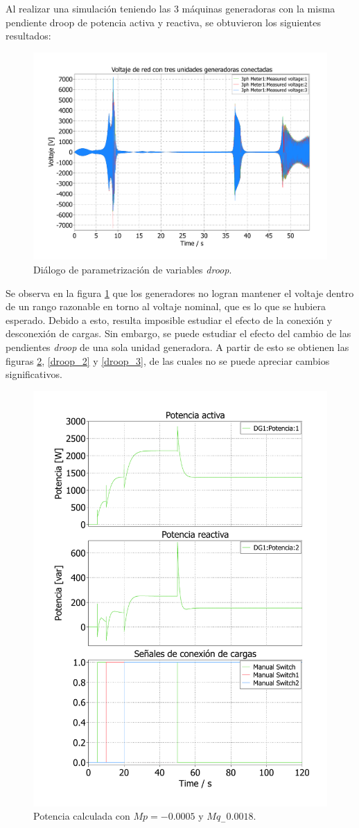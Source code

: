 Al realizar una simulación teniendo las 3 máquinas generadoras con la misma pendiente droop de potencia activa y reactiva, se obtuvieron los siguientes resultados:

\begin{figure}
   \centering
   \includegraphics[width=0.5\linewidth]{Tarea 1/report/imagenes/p3a/resonancia_generadores.pdf}
   \caption{Diálogo de parametrización de variables \textit{droop}.}
   \label{resonancia_generadores}
\end{figure}

Se observa en la figura \ref{resonancia_generadores} que los generadores no logran mantener el voltaje dentro de un rango razonable en torno al voltaje nominal, que es lo que se hubiera esperado. Debido a esto, resulta imposible estudiar el efecto de la conexión y desconexión de cargas. Sin embargo, se puede estudiar el efecto del cambio de las pendientes \textit{droop} de una sola unidad generadora. A partir de esto se obtienen las figuras \ref{droop_1}, \ref{droop_2} y \ref{droop_3}, de las cuales no se puede apreciar cambios significativos.


\begin{figure}
   \centering
   \includegraphics[width=0.5\linewidth]{Tarea 1/report/imagenes/p3a/droop_1.pdf}
   \caption{Potencia calculada con $Mp = -0.0005$ y $Mq_-0.0018$.}
   \label{droop_1}
\end{figure}

